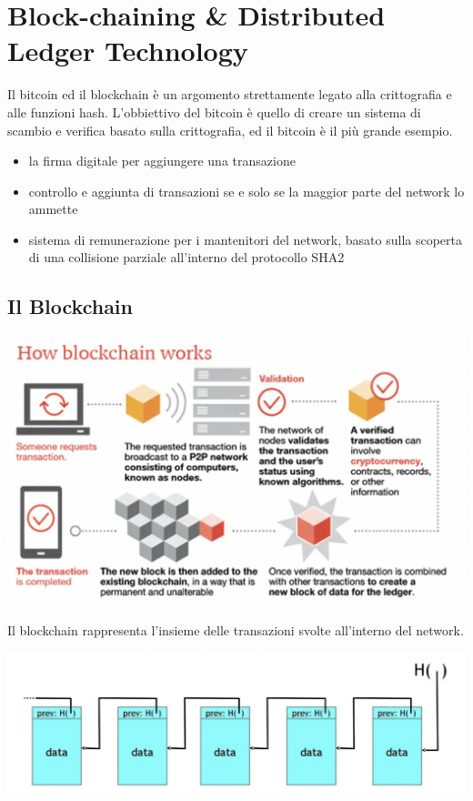 \documentclass[11pt, oneside]{article}   	%
\begin{document}
\section*{Block-chaining \& Distributed Ledger Technology}
Il bitcoin ed il blockchain è un argomento strettamente legato alla crittografia e alle funzioni hash.
L'obbiettivo del bitcoin è quello di creare un sistema di scambio e verifica basato sulla crittografia, ed il bitcoin è il più grande esempio.
\begin{itemize}
\item la firma digitale per aggiungere una transazione
\item controllo e aggiunta di transazioni se e solo se la maggior parte del network lo ammette
\item sistema di remunerazione per i mantenitori del network, basato sulla scoperta di una collisione parziale all'interno del protocollo SHA2
\end{itemize}

\subsection*{Il Blockchain}
\begin{center}
\includegraphics[scale= 0.5]{bchainoverview}
\end{center}
Il blockchain rappresenta l'insieme delle transazioni svolte all'interno del network.
\begin{center}
\includegraphics[scale= 0.5]{bchain}
\end{center}
\end{document}
